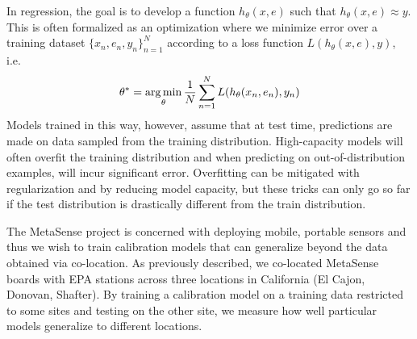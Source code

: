 \documentclass[journal abbreviation, manuscript]{copernicus}
\begin{document}
In regression, the goal is to develop a function $h_\theta(x, e)$
such that $h_\theta(x, e) \approx y$. This is often formalized as an optimization where we minimize error over a training dataset $\{x_n, e_n, y_n\}_{n = 1}^N$ according to a loss function $L(h_\theta(x, e), y)$, i.e. 
\begin{equation}
\theta^* = \operatorname*{arg\,min}_\theta \frac{1}{N}\sum_{n = 1}^N L(h_\theta(x_n, e_n), y_n)
\end{equation}
Models trained in this way, however, assume that at test time, predictions
are made on data sampled from the training distribution. 
High-capacity models will often overfit the training distribution and when
predicting on out-of-distribution examples, will incur significant
error. Overfitting can be mitigated with regularization and by reducing
model capacity, but these tricks can only go so far if the test distribution
is drastically different from the train distribution.

The MetaSense project is concerned with deploying mobile, portable
sensors and thus we wish to train calibration models
that can generalize beyond the data obtained via co-location.
As previously described, we co-located MetaSense boards with EPA stations across three locations in California (El Cajon, Donovan, Shafter).
By training a calibration model on a training data restricted to some sites and testing on the other site, we measure how well particular models generalize to different locations.
\end{document}
